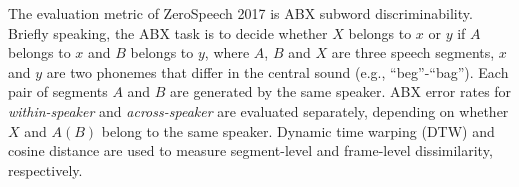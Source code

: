\documentclass[a4paper]{article}
\newcommand{\quotes}[1]{``#1''}
\begin{document}
The evaluation metric of ZeroSpeech 2017 is ABX subword discriminability. Briefly speaking, the ABX task is to decide whether $X$ belongs to $x$ or $y$ if $A$ belongs to $x$ and $B$ belongs to $y$, where $A$, $B$ and $X$ are three speech segments, $x$ and $y$ are two phonemes that differ in the central sound (e.g., \quotes{beg}-\quotes{bag}). 
Each pair of segments $A$ and $B$ are generated by the same speaker. 
ABX error rates for \textit{within-speaker} and \textit{across-speaker} are evaluated separately, depending on whether $X$ and $A(B)$ belong to the same speaker.
Dynamic time warping (DTW) and cosine distance are used to measure segment-level and frame-level dissimilarity, respectively.
\end{document}
